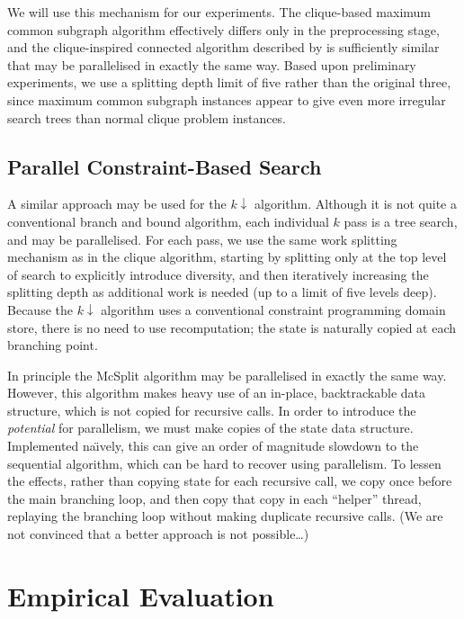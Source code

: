 \documentclass[sigconf]{acmart}
\begin{document}
We will use this mechanism for our experiments.  The clique-based maximum common subgraph algorithm
effectively differs only in the preprocessing stage, and the clique-inspired connected algorithm
described by \citet{DBLP:conf/cp/McCreeshNPS16} is sufficiently similar that may be parallelised in
exactly the same way. Based upon preliminary experiments, we use a splitting depth limit of five
rather than the original three, since maximum common subgraph instances appear to give even more
irregular search trees than normal clique problem instances.

\subsection{Parallel Constraint-Based Search}

A similar approach may be used for the $k{\downarrow}$ algorithm. Although it is not quite a
conventional branch and bound algorithm, each individual $k$ pass is a tree search, and may be
parallelised. For each pass, we use the same work splitting mechanism as in the clique algorithm,
starting by splitting only at the top level of search to explicitly introduce diversity, and then
iteratively increasing the splitting depth as additional work is needed (up to a limit of five
levels deep).  Because the $k{\downarrow}$ algorithm uses a conventional constraint programming
domain store, there is no need to use recomputation; the state is naturally copied at each branching
point.

In principle the McSplit algorithm may be parallelised in exactly the same way. However, this
algorithm makes heavy use of an in-place, backtrackable data structure, which is not copied for
recursive calls. In order to introduce the \emph{potential} for parallelism, we must make
copies of the state data structure. Implemented na{\"\i}vely, this can give an order of magnitude
slowdown to the sequential algorithm, which can be hard to recover using parallelism. To lessen the
effects, rather than copying state for each recursive call, we copy once before the main branching
loop, and then copy that copy in each ``helper'' thread, replaying the branching loop without making
duplicate recursive calls.  (We are not convinced that a better approach is not possible\ldots)

\section{Empirical Evaluation}
\end{document}
